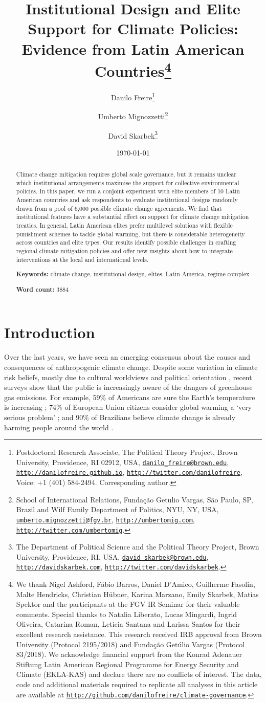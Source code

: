 \documentclass[a4paper,12pt]{article}
\title{Institutional Design and Elite Support for Climate Policies: Evidence from Latin American Countries\thanks{We thank Nigel Ashford, F\'{a}bio Barros, Daniel D'Amico, Guilherme Fasolin, Malte Hendricks, Christian H\"{u}bner, Karina Marzano, Emily Skarbek, Matias Spektor and the participants at the FGV IR Seminar for their valuable comments. Special thanks to Natalia Liberato, Lucas Mingardi, Ingrid Oliveira, Catarina Roman, Leticia Santana and Larissa Santos for their excellent research assistance. This research received IRB approval from Brown University (Protocol 2195/2018) and Funda\c{c}\~{a}o Get\'{u}lio Vargas (Protocol 83/2018). We acknowledge financial support from the Konrad Adenauer Stiftung Latin American Regional Programme for Energy Security and Climate (EKLA-KAS) and declare there are no conflicts of interest. The data, code and additional materials required to replicate all analyses in this article are available at \href{http://github.com/danilofreire/climate-governance}{\texttt{http://github.com/danilofreire/climate-governance}}.}
}
\author{Danilo Freire\thanks{Postdoctoral Research Associate, The Political Theory Project, Brown University, Providence, RI 02912, USA, \href{mailto:danilo_freire@brown.edu}{\texttt{danilo\_freire@brown.edu}}, \href{http://danilofreire.github.io}{\texttt{http://danilofreire.github.io}}, \href{http://twitter.com/danilofreire}{\texttt{http://twitter.com/danilofreire}}, Voice: +1 (401) 584-2494. Corresponding author.}
\and Umberto Mignozzetti\thanks{School of International Relations, Funda\c{c}\~{a}o Getulio Vargas, S\~{a}o Paulo, SP, Brazil and Wilf Family Department of Politics, NYU, NY, USA, \href{mailto:umberto.mignozzetti@fgv.br}{\texttt{umberto.mignozzetti@fgv.br}}, \href{http://umbertomig.com}{\texttt{http://umbertomig.com}}, \href{http://twitter.com/umbertomig}{\texttt{http://twitter.com/umbertomig}}.} 
\and David Skarbek\thanks{The Department of Political Science and the Political Theory Project, Brown University, Providence, RI, USA, \href{mailto:david_skarbek@brown.edu}{\texttt{david\_skarbek@brown.edu}}, \href{http://davidskarbek.com}{\texttt{http://davidskarbek.com}}, \href{http://twitter.com/davidskarbek}{\texttt{http://twitter.com/davidskarbek}}.}
}
\date{\today}
\begin{document}
\maketitle

\begin{abstract}
\onehalfspacing
\noindent
Climate change mitigation requires global scale governance, but it remains unclear which institutional arrangements maximise the support for collective environmental policies. In this paper, we run a conjoint experiment with elite members of 10 Latin American countries and ask respondents to evaluate institutional designs randomly drawn from a pool of 6,000 possible climate change agreements. We find that institutional features have a substantial effect on support for climate change mitigation treaties. In general, Latin American elites prefer multilevel solutions with flexible punishment schemes to tackle global warming, but there is considerable heterogeneity across countries and elite types. Our results identify possible challenges in crafting regional climate mitigation policies and offer new insights about how to integrate interventions at the local and international levels.

\vspace{.5cm}

\noindent 
\textbf{Keywords:} climate change, institutional design, elites, Latin America, regime complex

\vspace{.5cm}

\noindent 
\textbf{Word count:} 3884
\end{abstract}

\newpage

\doublespacing

\section{Introduction}%
\label{sec:introduction}

Over the last years, we have seen an emerging consensus about the causes and consequences of anthropogenic climate change. Despite some variation in climate risk beliefs, mostly due to cultural worldviews and political orientation \citep{hornsey2016meta}, recent surveys show that the public is increasingly aware of the dangers of greenhouse gas emissions. For example, 59\% of Americans are sure the Earth's temperature is increasing \citep{stanfordearth2018}; 74\% of European Union citizens consider global warming a `very serious problem' \citep{europe2018survey}; and 90\% of Brazilians believe climate change is already harming people around the world \citep{pew2018climate}.
\end{document}

